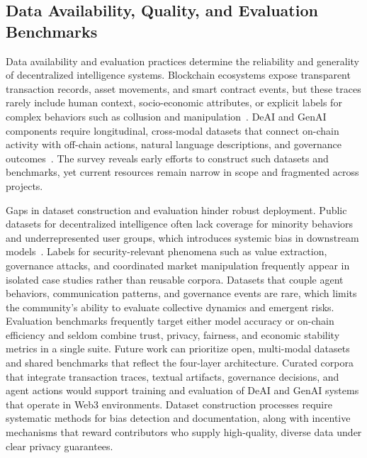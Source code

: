 \documentclass[5p,twocolumn]{elsarticle}
\begin{document}
\subsection{Data Availability, Quality, and Evaluation Benchmarks}
Data availability and evaluation practices determine the reliability and generality of decentralized intelligence systems. Blockchain ecosystems expose transparent transaction records, asset movements, and smart contract events, but these traces rarely include human context, socio-economic attributes, or explicit labels for complex behaviors such as collusion and manipulation~\cite{jain2024wire}. DeAI and GenAI components require longitudinal, cross-modal datasets that connect on-chain activity with off-chain actions, natural language descriptions, and governance outcomes~\cite{akanfe2024blockchain,nikolentzos2023synthetic}. The survey reveals early efforts to construct such datasets and benchmarks, yet current resources remain narrow in scope and fragmented across projects.

Gaps in dataset construction and evaluation hinder robust deployment. Public datasets for decentralized intelligence often lack coverage for minority behaviors and underrepresented user groups, which introduces systemic bias in downstream models~\cite{liu2019decentralized}. Labels for security-relevant phenomena such as value extraction, governance attacks, and coordinated market manipulation frequently appear in isolated case studies rather than reusable corpora. Datasets that couple agent behaviors, communication patterns, and governance events are rare, which limits the community's ability to evaluate collective dynamics and emergent risks. Evaluation benchmarks frequently target either model accuracy or on-chain efficiency and seldom combine trust, privacy, fairness, and economic stability metrics in a single suite. Future work can prioritize open, multi-modal datasets and shared benchmarks that reflect the four-layer architecture. Curated corpora that integrate transaction traces, textual artifacts, governance decisions, and agent actions would support training and evaluation of DeAI and GenAI systems that operate in Web3 environments. Dataset construction processes require systematic methods for bias detection and documentation, along with incentive mechanisms that reward contributors who supply high-quality, diverse data under clear privacy guarantees. 
\end{document}
